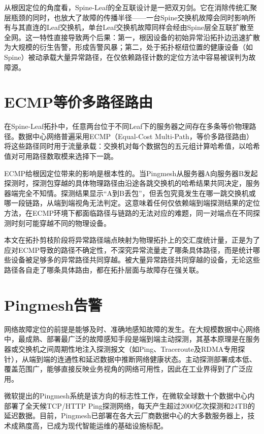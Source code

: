 从根因定位的角度看，Spine-Leaf的全互联设计是一把双刃剑。它在消除传统汇聚层瓶颈的同时，也放大了故障的传播半径——一台Spine交换机故障会同时影响所有与其直连的Leaf交换机，单台Leaf交换机故障同样会经由Spine层全互联扩散至全网。这一特性直接导致两个后果：第一，根因设备的初始异常沿拓扑边迅速扩散为大规模的衍生告警，形成告警风暴；第二，处于拓扑枢纽位置的健康设备（如Spine）被动承载大量异常路径，在仅依赖路径计数的定位方法中容易被误判为故障源。

\section{ECMP等价多路径路由}

在Spine-Leaf拓扑中，任意两台位于不同Leaf下的服务器之间存在多条等价物理路径。数据中心网络普遍采用ECMP（Equal-Cost Multi-Path，等价多路径路由）将这些路径同时用于流量承载：交换机对每个数据包的五元组计算哈希值，以哈希值对可用路径数取模来选择下一跳。

ECMP给根因定位带来的影响是根本性的。当Pingmesh从服务器A向服务器B发起探测时，探测包穿越的具体物理路径由沿途各跳交换机的哈希结果共同决定，服务器端完全不知情。探测结果显示“A到B丢包”，但丢包究竟发生在哪一跳交换机或哪一段链路，从端到端视角无法判定。这意味着任何仅依赖端到端探测结果的定位方法，在ECMP环境下都面临路径与链路的无法对应的难题，同一对端点在不同探测时刻可能穿越不同的物理设备。

本文在拓扑剪枝阶段将异常路径端点映射为物理拓扑上的交汇度统计量，正是为了应对ECMP导致的路径不确定性，不深究异常流量走了哪条具体路径，而是统计哪些设备被足够多的异常路径共同穿越。被大量异常路径共同穿越的设备，无论这些路径各自走了哪条具体路由，都在拓扑层面与故障存在强关联。

\section{Pingmesh告警}

网络故障定位的前提是能够及时、准确地感知故障的发生。在大规模数据中心网络中，最成熟、部署最广泛的故障感知手段是端到端主动探测，其基本原理是在服务器或交换机之间周期性地注入探测报文（如Ping、Traceroute及RDMA专用探针），从端到端的连通性和延迟数据中推断网络健康状态。主动探测部署成本低、覆盖范围广，能够直接反映业务视角的网络可用性，因此在工业界得到了广泛应用。

微软提出的Pingmesh系统是该方向的标志性工作，在微软全球数十个数据中心内部署了全天候TCP/HTTP Ping探测网络，每天产生超过2000亿次探测和24TB的延迟数据。目前，Pingmesh已部署在各大云厂商数据中心的大多数服务器上，技术成熟度高，已成为现代智能运维的基础设施标配。

